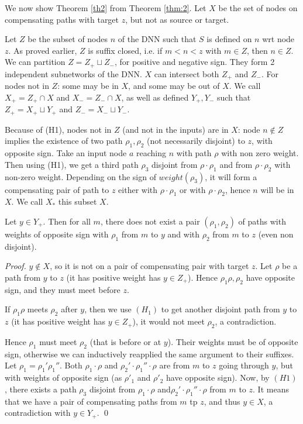 			\smallskip


			We now show Theorem \ref{th2} from Theorem \ref{thm:2}.
			Let $X$ be the set of nodes on compensating paths with target $z$, but not as source or target.
		
			Let $Z$ be the subset of nodes $n$ of the DNN such that $S$ is defined on $n$ 
			wrt node $z$. As proved earlier, $Z$ is suffix closed, i.e. if $m<n<z$ with $m \in Z$, then $n \in Z$. We can partition $Z = Z_{+} \sqcup Z_{-}$, for positive and negative sign. They form 2 independent subnetworks of the DNN.
			$X$ can intersect both $Z_+$ and $Z_-$.
			For nodes not in $Z$: some may be in $X$, and some may be out of $X$.
			We call $X_+ = Z_+ \cap X$ and $X_-=Z_- \cap X$, as well as 
			defined $Y_+,Y_-$ such that $Z_+ = X_+ \sqcup Y_+$ and $Z_- = X_- \sqcup Y_-$.
			
			Because of (H1), nodes not in $Z$ (and not in the inputs) are in $X$:
			node $n \notin Z$ implies the existence of two path $\rho_1,\rho_2$ (not necessarily disjoint) to $z$, with opposite sign. 
			Take an input node $a$ reaching $n$ with path $\rho$ with non zero weight.
			Then using (H1), we get a third path $\rho_3$ disjoint from $\rho \cdot \rho_1$ and from $\rho \cdot \rho_2$ with non-zero weight. Depending on the sign of $weight(\rho_3)$, it will form a compensating pair of path to $z$ either with $\rho \cdot \rho_1$ or with $\rho \cdot \rho_2$, hence $n$ will be in $X$. We call $X_*$ this subset $X$.
			
			
\begin{lemma}
	\label{lemma10}
		Let $y \in Y_+$. Then for all $m$, there does not exist a pair $(\rho_1,\rho_2)$ 
		of paths  with weights of opposite sign with $\rho_1$ from $m$ to $y$ and 
		with $\rho_2$ from $m$ to $z$ (even non disjoint).
\end{lemma}

\begin{proof}
  $y \notin X$, so it is not on a pair of compensating pair with target $z$.
  Let $\rho$ be a path from $y$ to $z$ (it has positive weight has $y \in Z_+$).
  Hence $\rho_1 \rho, \rho_2$ have opposite sign, and they must meet before $z$.

  If $\rho_1 \rho$ meets $\rho_2$ after $y$, then we use $(H_1)$ to get another disjoint path from $y$ to $z$ (it has positive weight has $y \in Z_+$), it would not meet $\rho_2$, a contradiction.

  Hence $\rho_1$ must meet $\rho_2$ (that is before or at $y$).
  Their weights must be of opposite sign, otherwise we can inductively reapplied the same argument to their suffixes.
  Let $\rho_1=\rho_1'\rho_1''$.
  Both $\rho_1 \cdot \rho$ and $\rho_2' \cdot \rho_1'' \cdot \rho$
  are from $m$ to $z$ going through $y$, but with weights of opposite sign (as $\rho'_1$ and $\rho'_2$ have opposite sign).
  Now, by $(H1)$, there exists a path $\rho_3$ disjoint from $\rho_1 \cdot \rho$ and$\rho_2' \cdot \rho_1'' \cdot \rho$ from $m$ to $z$. It means that we have a pair of compensating paths from $m$ tp $z$, and thus $y \in X$, a contradiction with $y \in Y_+$. \qed
\end{proof}

